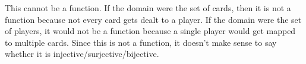 \documentclass[10pt,]{book}
\theoremstyle{plain}
\theoremstyle{definition}
\theoremstyle{definition}
\theoremstyle{definition}
\begin{document}
\begin{exerciselist}
            This cannot be a function. If the domain were the set of cards, then it is not a function because not every card gets dealt to a player. If the domain were the set of players, it would not be a function because a single player would get mapped to multiple cards. Since this is not a function, it doesn't make sense to say whether it is injective/surjective/bijective.
\end{exerciselist}
\end{document}
